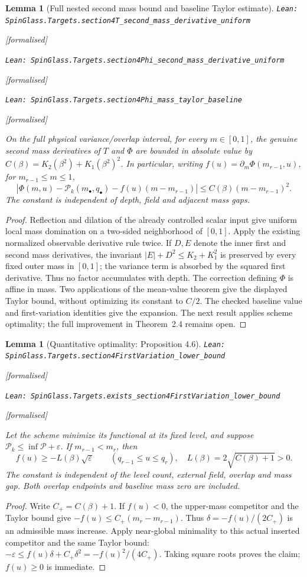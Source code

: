 \documentclass[11pt]{article}
\providecommand{\lean}[1]{\leavevmode\par\nopagebreak
  {\noindent\normalfont\footnotesize\raggedright\texttt{Lean: #1}\par}\nopagebreak}
\providecommand{\leanok}{\par\nopagebreak
  {\noindent\normalfont\footnotesize\textcolor{green!50!black}{[formalised]}\par}\nopagebreak}
\newtheorem{lemma}[theorem]{Lemma}
\begin{document}
\begin{lemma}[Full nested second mass bound and baseline Taylor estimate]
\lean{SpinGlass.Targets.section4T\_second\_mass\_derivative\_uniform}\leanok
\lean{SpinGlass.Targets.section4Phi\_second\_mass\_derivative\_uniform}\leanok
\lean{SpinGlass.Targets.section4Phi\_mass\_taylor\_baseline}\leanok
On the full physical variance/overlap interval, for every $m\in[0,1]$,
the genuine second mass derivatives of $T$ and $\Phi$ are bounded in absolute
value by $C(\beta)=K_2(\beta^2)+K_1(\beta^2)^2$. In particular, writing
$f(u)=\partial_m\Phi(m_{r-1},u)$, for $m_{r-1}\le m\le1$,
\[
 |\Phi(m,u)-\mathcal P_k(m_\bullet,q_\bullet)-f(u)(m-m_{r-1})|
 \le C(\beta)(m-m_{r-1})^2.
\]
The constant is independent of depth, field and adjacent mass gaps.
\end{lemma}
\begin{proof}
Reflection and dilation of the already controlled scalar input give uniform
local mass domination on a two-sided neighborhood of $[0,1]$. Apply the
existing normalized observable derivative rule twice. If $D,E$ denote the
inner first and second mass derivatives, the invariant
$|E|+D^2\le K_2+K_1^2$ is preserved by every fixed outer mass in $[0,1]$;
the variance term is absorbed by the squared first derivative. Thus no factor
accumulates with depth. The correction defining $\Phi$ is affine in mass.
Two applications of the mean-value theorem give the displayed Taylor bound,
without optimizing its constant to $C/2$. The checked baseline value and
first-variation identities give the expansion. The next result applies
scheme optimality; the full improvement in Theorem~2.4 remains open.
\end{proof}

\begin{lemma}[Quantitative optimality: Proposition 4.6]
\lean{SpinGlass.Targets.section4FirstVariation\_lower\_bound}\leanok
\lean{SpinGlass.Targets.exists\_section4FirstVariation\_lower\_bound}\leanok
Let the scheme minimize its functional at its fixed level, and suppose
$\mathcal P_k\le\inf\mathcal P+\varepsilon$. If $m_{r-1}<m_r$, then
\[
 f(u)\ge-L(\beta)\sqrt\varepsilon\qquad(q_{r-1}\le u\le q_r),
 \quad L(\beta)=2\sqrt{C(\beta)+1}>0.
\]
The constant is independent of the level count, external field, overlap and
mass gap. Both overlap endpoints and baseline mass zero are included.
\end{lemma}
\begin{proof}
Write $C_+=C(\beta)+1$. If $f(u)<0$, the upper-mass competitor and the
Taylor bound give $-f(u)\le C_+(m_r-m_{r-1})$. Thus
$\delta=-f(u)/(2C_+)$ is an admissible mass increase. Apply near-global
minimality to this actual inserted competitor and the same Taylor bound:
$-\varepsilon\le f(u)\delta+C_+\delta^2=-f(u)^2/(4C_+)$.
Taking square roots proves the claim; $f(u)\ge0$ is immediate.
\end{proof}
\end{document}
